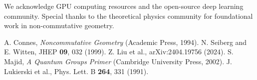 \documentclass[twocolumn,showpacs,preprintnumbers,amsmath,amssymb,aps,prl]{revtex4-1}
\begin{document}
\begin{acknowledgments}
We acknowledge GPU computing resources and the open-source deep learning community. Special thanks to the theoretical physics community for foundational work in non-commutative geometry.
\end{acknowledgments}

\begin{thebibliography}{99}
 A. Connes, \textit{Noncommutative Geometry} (Academic Press, 1994).
 N. Seiberg and E. Witten, JHEP \textbf{09}, 032 (1999).
 Z. Liu et al., arXiv:2404.19756 (2024).
 S. Majid, \textit{A Quantum Groups Primer} (Cambridge University Press, 2002).
 J. Lukierski et al., Phys. Lett. B \textbf{264}, 331 (1991).
\end{thebibliography}
\end{document}
